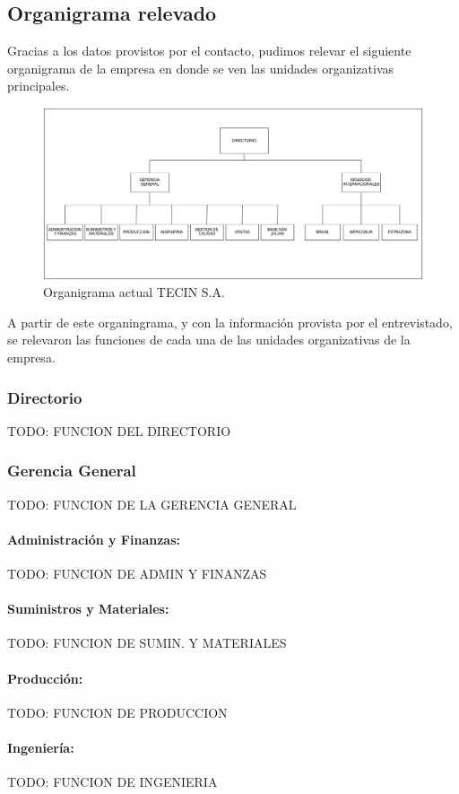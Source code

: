 \documentclass[a4paper,10pt]{article}
\begin{document}
	\subsection{Organigrama relevado}
	Gracias a los datos provistos por el contacto, pudimos relevar el siguiente organigrama de la empresa en donde se ven las unidades organizativas principales.
	\begin{figure}[H]
		\centering
		\includegraphics[width=15cm]{imagenes/actualOrganigrama.png}
		\caption{Organigrama actual TECIN S.A.}
	\end{figure}
	A partir de este organingrama, y con la información provista por el entrevistado, se relevaron las funciones de cada una de las unidades organizativas de la empresa.
		\subsubsection{Directorio}
			TODO: FUNCION DEL DIRECTORIO
		\subsubsection{Gerencia General}
			TODO: FUNCION DE LA GERENCIA GENERAL
			\paragraph{Administración y Finanzas:}
			TODO: FUNCION DE ADMIN Y FINANZAS
			\paragraph{Suministros y Materiales:}
			TODO: FUNCION DE SUMIN. Y MATERIALES
			\paragraph{Producción:}
			TODO: FUNCION DE PRODUCCION
			\paragraph{Ingeniería:}
			TODO: FUNCION DE INGENIERIA
\end{document}
